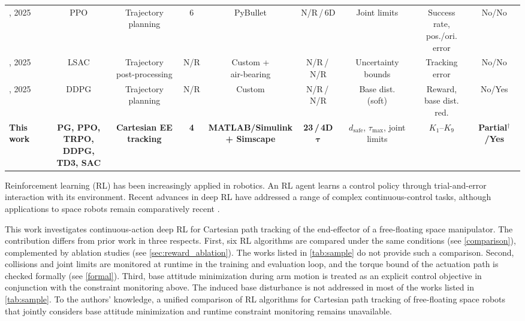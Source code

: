 \documentclass{ieeeaccess}
\begin{document}
\begin{table}[!t]
\begin{tabular}{lcccccccc}
		\cite{hu2025deep}, 2025 & PPO & Trajectory planning & 6 & PyBullet & N/R\,/\,6D & Joint limits &
		  \makecell{Success rate,\\pos./ori. error} & No/No \\
		\cite{zhang2025learning}, 2025 & LSAC & \makecell{Trajectory\\post-processing} & N/R &
		  \makecell{Custom +\\air-bearing} & N/R\,/\,N/R & \makecell{Uncertainty\\bounds} & Tracking error &
		  No/No \\
		\cite{wei2025trajectory}, 2025 & DDPG & Trajectory planning & N/R & Custom & N/R\,/\,N/R &
		  \makecell{Base dist.\\(soft)} & \makecell{Reward,\\base dist. red.} & No/Yes \\
		\midrule
		\textbf{This work} & \makecell{\textbf{PG, PPO,}\\\textbf{TRPO, DDPG,}\\\textbf{TD3, SAC}} &
		  \makecell{\textbf{Cartesian EE}\\\textbf{tracking}} & \textbf{4} &
		  \makecell{\textbf{MATLAB/Simulink}\\\textbf{+ Simscape}} & \textbf{23\,/\,4D} $\boldsymbol{\tau}$ &
		  \makecell{$d_{\mathrm{safe}}$, $\tau_{\max}$,\\joint limits} & $K_1$--$K_9$ &
		  \textbf{Partial}$^{\dagger}$\textbf{/Yes} \\
		\bottomrule
	\end{tabular}
\end{table}

Reinforcement learning (RL) has been increasingly applied in robotics. An RL agent learns a control policy
through trial-and-error interaction with its environment. Recent advances in deep RL
have addressed a range of complex continuous-control tasks, although applications to space robots remain
comparatively recent \cite{wu2020reinforcement,al2024path,hu2025deep,zhang2025learning,huang2023obstacle}.

This work investigates continuous-action deep RL for Cartesian path tracking of the end-effector of
a free-floating space
manipulator. The contribution differs from prior work in three respects. First, six RL algorithms are compared
under the same conditions (see \cref{comparison}), complemented by ablation studies (see \cref{sec:reward_ablation}).
The works listed in \cref{tab:sample} do not provide such a comparison. Second, collisions and joint limits
are monitored at runtime in the training and evaluation loop, and the torque bound of the actuation path is
checked formally (see \cref{formal}). Third, base attitude minimization during arm motion is treated as an
explicit control objective in conjunction with the constraint monitoring above. The induced base
disturbance is not addressed in most of the works listed in \cref{tab:sample}. To the authors' knowledge,
a unified comparison of RL algorithms for Cartesian path tracking of free-floating space robots that
jointly considers base attitude minimization and runtime constraint monitoring remains unavailable.
\end{document}
